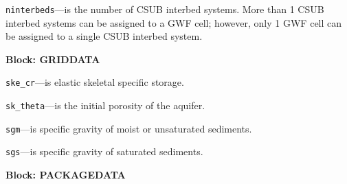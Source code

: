 \begin{description}
\item \texttt{ninterbeds}---is the number of CSUB interbed systems.  More than 1 CSUB interbed systems can be assigned to a GWF cell; however, only 1 GWF cell can be assigned to a single CSUB interbed system.

\end{description}
\item \textbf{Block: GRIDDATA}

\begin{description}
\item \texttt{ske\_cr}---is elastic skeletal specific storage.

\item \texttt{sk\_theta}---is the initial porosity of the aquifer.

\item \texttt{sgm}---is specific gravity of moist or unsaturated sediments.

\item \texttt{sgs}---is specific gravity of saturated sediments.

\end{description}
\item \textbf{Block: PACKAGEDATA}

